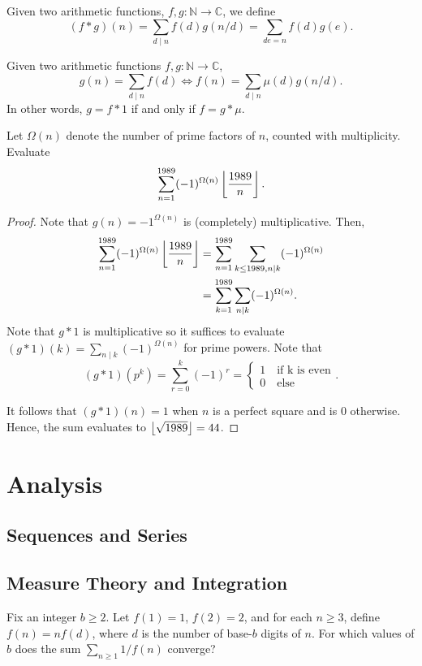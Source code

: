 \documentclass[11pt]{article}
\newcommand{\N}{\mathbb{N}}
\newcommand{\C}{\mathbb C}
\renewcommand{\>}{\rangle}
\newcommand{\<}{\langle}
\begin{document}
\begin{definition} Given two arithmetic functions, $f, g: \N \to \C$, we define 
$$(f * g)(n) = \sum_{d \mid n} f(d) g(n/d) = \sum_{de = n} f(d) g(e).$$
\end{definition}

\begin{theorem} Given two arithmetic functions $f, g: \N \to \C$, 
$$g(n) = \sum_{d \mid n} f(d) \Longleftrightarrow f(n) = \sum_{d  \mid n} \mu(d) g(n/d).$$
In other words, $g = f * 1$ if and only if $f = g * \mu$.
\end{theorem}

\begin{problem}[Bulgaria 1989] Let $\Omega(n)$ denote the number of prime factors of $n$, counted with multiplicity.  Evaluate 
$$\sum_{n=1}^{1989} (-1)^{\Omega(n)} \left\lfloor \frac{1989}{n} \right\rfloor.$$
\end{problem}
\begin{proof}
Note that $g(n) = -1^{\Omega(n)}$ is (completely) multiplicative.  Then,
\begin{align*}
\sum_{n=1}^{1989} (-1)^{\Omega(n)} \left\lfloor \frac{1989}{n} \right\rfloor &= \sum_{n=1}^{1989} \sum_{k \le 1989, n \mid k}  (-1)^{\Omega(n)} \\
&= \sum_{k=1}^{1989} \sum_{n \mid k} (-1)^{\Omega(n)}.
\end{align*}
Note that $g * 1$ is multiplicative so it suffices to evaluate $(g * 1)(k) = \sum_{n \mid k} (-1)^{\Omega(n)}$ for prime powers.  Note that 
$$(g*1)(p^k) = \sum_{r=0}^k (-1)^{r} = \begin{cases}
1 \quad \text{if k is even}\\
0 \quad \text{else}
\end{cases}.$$

It follows that $(g*1)(n) = 1$ when $n$ is a perfect square and is $0$ otherwise.  Hence, the sum evaluates to $\left\lfloor \sqrt{1989} \right\rfloor = 44$.
\end{proof} 
\pagebreak
\section{Analysis}
\subsection{Sequences and Series}
\subsection{Measure Theory and Integration}
\begin{problem}[Putnam 2002/A6] Fix an integer $b \ge 2$.  Let $f(1) = 1$, $f(2) = 2$, and for each $n \ge 3$, define $f(n) = nf(d)$, where $d$ is the number of base-$b$ digits of $n$.  For which values of $b$ does the sum $\sum_{n \ge 1} 1/f(n)$ converge?
\end{problem}
\end{document}
